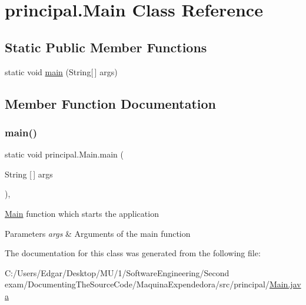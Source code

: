 \hypertarget{classprincipal_1_1_main}{}\section{principal.\+Main Class Reference}
\label{classprincipal_1_1_main}
\subsection*{Static Public Member Functions}
\begin{DoxyCompactItemize}
\item 
static void \mbox{\hyperlink{classprincipal_1_1_main_a8c5178ba5330fea05fc8588925aa0947}{main}} (String\mbox{[}$\,$\mbox{]} args)
\end{DoxyCompactItemize}


\subsection{Member Function Documentation}
\mbox{\label{classprincipal_1_1_main_a8c5178ba5330fea05fc8588925aa0947}} 
\subsubsection{\texorpdfstring{main()}{main()}}
{\footnotesize\ttfamily static void principal.\+Main.\+main (\begin{DoxyParamCaption}\item[{String \mbox{[}$\,$\mbox{]}}]{args }\end{DoxyParamCaption})\hspace{0.3cm}{\ttfamily [inline]}, {\ttfamily [static]}}

\mbox{\hyperlink{classprincipal_1_1_main}{Main}} function which starts the application 
\begin{DoxyParams}{Parameters}
{\em args} & Arguments of the main function \\
\hline
\end{DoxyParams}


The documentation for this class was generated from the following file\+:\begin{DoxyCompactItemize}
\item 
C\+:/\+Users/\+Edgar/\+Desktop/\+M\+U/1/\+Software\+Engineering/\+Second exam/\+Documenting\+The\+Source\+Code/\+Maquina\+Expendedora/src/principal/\mbox{\hyperlink{_main_8java}{Main.\+java}}\end{DoxyCompactItemize}
